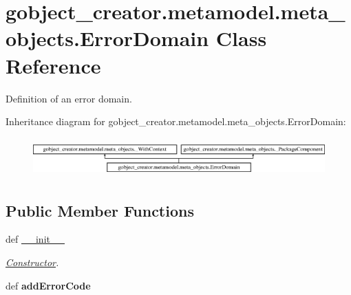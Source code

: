 \hypertarget{classgobject__creator_1_1metamodel_1_1meta__objects_1_1ErrorDomain}{
\section{gobject\_\-creator.metamodel.meta\_\-objects.ErrorDomain Class Reference}
\label{classgobject__creator_1_1metamodel_1_1meta__objects_1_1ErrorDomain}
}


Definition of an error domain.  


Inheritance diagram for gobject\_\-creator.metamodel.meta\_\-objects.ErrorDomain:\begin{figure}[H]
\begin{center}
\leavevmode
\includegraphics[height=1.50538cm]{classgobject__creator_1_1metamodel_1_1meta__objects_1_1ErrorDomain}
\end{center}
\end{figure}
\subsection*{Public Member Functions}
\begin{DoxyCompactItemize}
\item 
def \hyperlink{classgobject__creator_1_1metamodel_1_1meta__objects_1_1ErrorDomain_a181b703484bd6321e6e2bffbf78eb024}{\_\-\_\-init\_\-\_\-}
\begin{DoxyCompactList}\small\item\em \hyperlink{classgobject__creator_1_1metamodel_1_1meta__objects_1_1Constructor}{Constructor}. \item\end{DoxyCompactList}\item 
\hypertarget{classgobject__creator_1_1metamodel_1_1meta__objects_1_1ErrorDomain_ae90a02a2dce98751efc7133a917c2046}{
def {\bfseries addErrorCode}}
\label{classgobject__creator_1_1metamodel_1_1meta__objects_1_1ErrorDomain_ae90a02a2dce98751efc7133a917c2046}

\end{DoxyCompactItemize}
